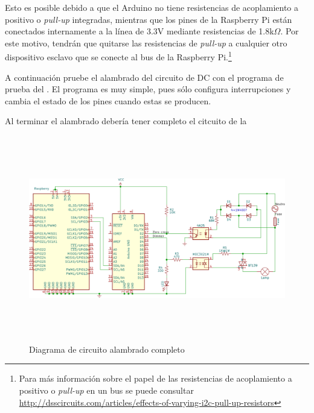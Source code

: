Esto es posible debido a que el Arduino no tiene resistencias de acoplamiento a positivo o \emph{pull-up} integradas, mientras que los pines \IIC de la Raspberry Pi están conectados internamente a la línea de 3.3V mediante resistencias de 1.8k\(\Omega{}\).
Por este motivo, tendrán que quitarse las resistencias de \emph{pull-up} a cualquier otro dispositivo esclavo que se conecte al bus \IIC de la Raspberry Pi.\footnote{Para más información sobre el papel de las resistencias de acoplamiento a positivo o \emph{pull-up} en un bus \IIC se puede consultar \url{http://dsscircuits.com/articles/effects-of-varying-i2c-pull-up-resistors} }

\medskip

A continuación pruebe el alambrado del circuito de DC con el programa de prueba del .
El programa es muy simple, pues sólo configura interrupciones y cambia el estado de los pines cuando estas se producen.



Al terminar el alambrado debería tener completo el citcuito de la 
\begin{figure}[H]
	\centering
	\includegraphics[width=0.75\columnwidth,height=9cm,keepaspectratio]{img/circuit-full.png}
	\caption{Diagrama de circuito alambrado completo}%
	\label{fig:circuit-full}
\end{figure}
